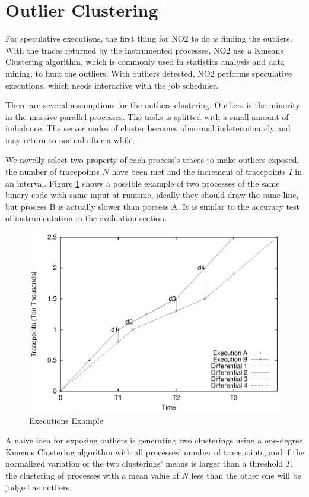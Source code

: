 \section{Outlier Clustering}

For speculative executions, the first thing for NO2 to do is finding the outliers. With the traces returned by the instrumented processes, NO2 use a Kmeans Clustering algorithm, which is commonly used in statistics analysis and data mining, to hunt the outliers. With outliers detected, NO2 performs speculative executions, which needs interactive with the job scheduler.

There are several assumptions for the outliers clustering. Outliers is the minority in the massive parallel processes. The tasks is splitted with a small amount of imbalance. The server nodes of cluster becomes abnormal indeterminately and may return to normal after a while.

We novelly select two property of each process's traces to make outliers exposed, the number of tracepoints $N$ have been met and the increment of tracepoints $I$ in an interval. Figure \ref{figure:executionsexample} shows a possible example of two processes of the same binary code with same input at runtime, ideally they should draw the same line, but process B is actually slower than porcess A. It is similar to the accuracy test of instrumentation in the evaluation section.

\begin{figure}
\centering
\includegraphics[width=0.9\columnwidth]{figures/executions_example.eps}
\caption{Executions Example}
\label{figure:executionsexample}
\end{figure}

A naive idea for exposing outliers is generating two clusterings using a one-degree Kmeans Clustering algorithm with all processes' number of tracepoints, and if the normalized variation of the two clusterings' means is larger than a threshold $T$, the clustering of processes with a mean value of $N$ less than the other one will be judged as outliers.

